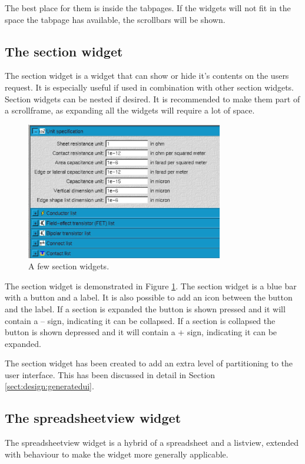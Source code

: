 The best place for them is inside the tabpages. If the widgets will not fit in
the space the tabpage has available, the scrollbars will be shown.

\subsection{The section widget} \label{sect:uidesign:section}
The section widget is a widget that can show or hide it's contents on the users
request. It is especially useful if used in combination with other section
widgets. Section widgets can be nested if desired. It is recommended to make
them part of a scrollframe, as expanding all the widgets will require a lot of
space.

\begin{figure}[ht] \begin{center}
\includegraphics[height=6cm]{./figures/section.eps}
\caption{A few section widgets.}
\label{fig:uidesign:section}
\end{center} \end{figure}

The section widget is demonstrated in Figure \ref{fig:uidesign:section}. The
section widget is a blue bar with a button and a label. It is also possible to
add an icon between the button and the label. If a section is expanded the
button is shown pressed and it will contain a -- sign, indicating it can be
collapsed. If a section is collapsed the button is shown depressed and it will
contain a + sign, indicating it can be expanded.

The section widget has been created to add an extra level of partitioning to
the user interface. This has been discussed in detail in Section
\ref{sect:design:generatedui}.

\subsection{The spreadsheetview widget} \label{sect:uidesign:spreadsheet}
The spreadsheetview widget is a hybrid of a spreadsheet and a listview,
extended with behaviour to make the widget more generally applicable.

